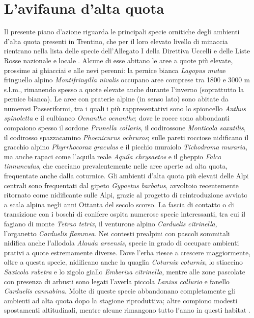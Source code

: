 \documentclass[10pt,twoside,openany,x11names,svgnames,italian,a5paper,dvipsnames,table]{memoir}
\begin{document}
\newpage
\section{L'avifauna d'alta quota}

Il presente piano d’azione riguarda le principali specie ornitiche degli ambienti d’alta quota presenti in Trentino, che per il loro elevato livello di minaccia rientrano nella lista delle specie dell’Allegato I della Direttiva Uccelli e delle Liste Rosse nazionale e locale \cite{Pedrini05} \cite{Peronace12}. 
Alcune di esse abitano le aree a quote più elevate, prossime ai ghiacciai e alle nevi perenni: la pernice bianca \emph{Lagopus muta}e fringuello alpino \emph{Montifringilla nivalis} occupano aree comprese tra 1800 e 3000 m s.l.m., rimanendo spesso a quote elevate anche durante l’inverno (soprattutto la pernice bianca). Le aree con praterie alpine (in senso lato) sono abitate da numerosi Passeriformi, tra i quali i più rappresentativi sono lo spioncello \emph{Anthus spinoletta} e il culbianco \emph{Oenanthe oenanthe}; dove le rocce sono abbondanti compaiono spesso il sordone \emph{Prunella collaris}, il codirossone \emph{Monticola saxatilis}, il codirosso spazzacamino \emph{Phoenicurus ochruros}; sulle pareti rocciose nidificano il gracchio alpino \emph{Phyrrhocorax graculus} e il picchio muraiolo \emph{Tichodroma muraria}, ma anche rapaci come l'aquila reale \emph{Aquila chrysaetos} e il gheppio \emph{Falco tinnunculus}, che cacciano prevalentemente nelle aree aperte ad alta quota, frequentate anche dalla coturnice. Gli ambienti d’alta quota più elevati delle Alpi centrali sono frequentati dal gipeto \emph{Gypaetus barbatus}, avvoltoio recentemente ritornato come nidificante sulle Alpi, grazie al progetto di reintroduzione avviato a scala alpina negli anni Ottanta \cite{Genero96} del secolo scorso.  La fascia di contatto o di transizione con i boschi di conifere ospita numerose specie interessanti, tra cui il fagiano di monte \emph{Tetrao tetrix}, il venturone alpino \emph{Carduelis citrinella}, l'organetto \emph{Carduelis flammea}. Nei contesti prealpini con pascoli sommitali nidifica anche l’allodola \emph{Alauda arvensis}, specie in grado di occupare ambienti prativi a quote estremamente diverse. Dove l’erba riesce a crescere maggiormente, oltre a questa specie, nidificano anche la quaglia \emph{Coturnix coturnix}, lo stiaccino \emph{Saxicola rubetra} e lo zigolo giallo \emph{Emberiza citrinella}, mentre alle zone pascolate con presenza di arbusti sono legati l'averla piccola \emph{Lanius collurio} e fanello \emph{Carduelis cannabina}. 
Molte di queste specie abbandonano completamente gli ambienti ad alta quota dopo la stagione riproduttiva; altre compiono modesti spostamenti altitudinali, mentre alcune rimangono tutto l’anno in questi habitat \cite{Brichetti03} \cite{Brichetti07} \cite{Brichetti08}.
\end{document}
